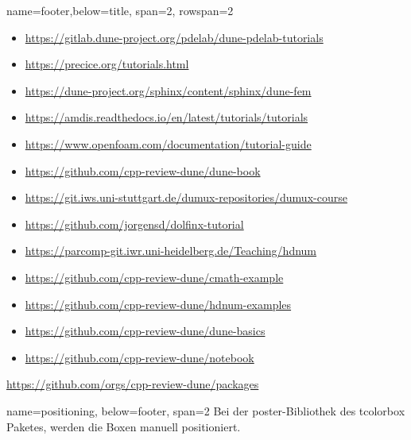 \documentclass[
	paper=a0,%
	style=ruled, %
	]{bfhsciposter}
\newcommand{\tbs}{\textbackslash}
\let\code\texttt
\newcommand*{\macro}[1]{\code{\tbs#1}}
\let\pck\textsf
\begin{document}
\begin{tcbposter}[
		poster={
				columns=4,
				rows=7,
				spacing=1cm,
			},]
\begin{posterboxenv}[title=Tutorials]{name=footer,below=title, span=2, rowspan=2 }



		\begin{itemize}
			\item \url{https://gitlab.dune-project.org/pdelab/dune-pdelab-tutorials}
			\item \url{https://precice.org/tutorials.html}
			\item \url{https://dune-project.org/sphinx/content/sphinx/dune-fem}
			\item \url{https://amdis.readthedocs.io/en/latest/tutorials/tutorials}
			\item \url{https://www.openfoam.com/documentation/tutorial-guide}
			\item \url{https://github.com/cpp-review-dune/dune-book}
			\item \url{https://git.iws.uni-stuttgart.de/dumux-repositories/dumux-course}
			\item \url{https://github.com/jorgensd/dolfinx-tutorial}
			\item \url{https://parcomp-git.iwr.uni-heidelberg.de/Teaching/hdnum}
			\item \url{https://github.com/cpp-review-dune/cmath-example}
			\item \url{https://github.com/cpp-review-dune/hdnum-examples}
			\item \url{https://github.com/cpp-review-dune/dune-basics}
			\item \url{https://github.com/cpp-review-dune/notebook}
		\end{itemize}

		\url{https://github.com/orgs/cpp-review-dune/packages}
	\end{posterboxenv}

	\begin{posterboxenv}[title=C++ Review Dune meets Arch4edu]{name=positioning, below=footer, span=2}
		Bei der \pck{poster}-Bibliothek des \pck{tcolorbox} Paketes, werden die Boxen manuell positioniert.


\end{posterboxenv}
\end{tcbposter}
\end{document}

